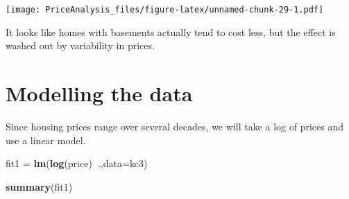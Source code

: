 \documentclass[]{article}
\newenvironment{Shaded}{\begin{snugshade}}{\end{snugshade}}
\newcommand{\KeywordTok}[1]{\textcolor[rgb]{0.13,0.29,0.53}{\textbf{#1}}}
\newcommand{\DataTypeTok}[1]{\textcolor[rgb]{0.13,0.29,0.53}{#1}}
\newcommand{\StringTok}[1]{\textcolor[rgb]{0.31,0.60,0.02}{#1}}
\newcommand{\OperatorTok}[1]{\textcolor[rgb]{0.81,0.36,0.00}{\textbf{#1}}}
\newcommand{\NormalTok}[1]{#1}
\begin{document}
\texttt{[image: PriceAnalysis\_files/figure-latex/unnamed-chunk-29-1.pdf]}

It looks like homes with basements actually tend to cost less, but the
effect is washed out by variability in prices.

\section{Modelling the data}\label{modelling-the-data}

Since housing prices range over several decades, we will take a log of
prices and use a linear model.

\begin{Shaded}
\begin{Highlighting}[]
\NormalTok{fit1 =}\StringTok{ }\KeywordTok{lm}\NormalTok{(}\KeywordTok{log}\NormalTok{(price)}\OperatorTok{~}\NormalTok{.,}\DataTypeTok{data=}\NormalTok{kc3)}
\end{Highlighting}
\end{Shaded}

\begin{Shaded}
\begin{Highlighting}[]
\KeywordTok{summary}\NormalTok{(fit1)}
\end{Highlighting}
\end{Shaded}
\end{document}
